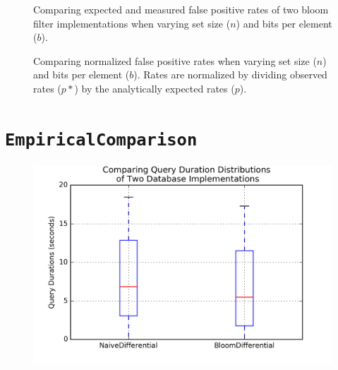 \documentclass[notitlepage]{report}
\begin{document}
\begin{figure}[h]
  \caption{Comparing expected and measured false positive rates of two bloom
           filter implementations when varying set size ($n$) and
           bits per element ($b$).}
\end{figure}

\begin{figure}[h]
  \caption{Comparing normalized false positive rates when varying set size ($n$)
           and bits per element ($b$). Rates are normalized by dividing observed
           rates ($p*$) by the analytically expected rates ($p$).}
\end{figure}


\section{\texttt{EmpiricalComparison}}

\begin{figure}[h]
  \includegraphics[width=\textwidth]{figures/empirical_comparison/query_duration_box_plot.png}
\end{figure}
\end{document}

